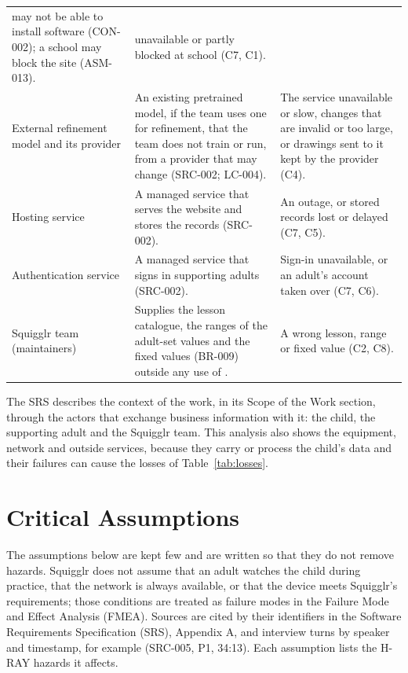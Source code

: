 \documentclass{article}
\begin{document}
{\begin{longtable}{@{}
  >{\raggedright\arraybackslash}p{}
  >{\raggedright\arraybackslash}p{}
  >{\raggedright\arraybackslash}p{}@{}}
may not be able to install software (CON-002); a school may block the site
(ASM-013). & \progname{} unavailable or partly blocked at school (C7, C1). \\
\addlinespace
External refinement model and its provider & An existing pretrained model, if
the team uses one for refinement, that the team does not train or run, from a
provider that may change (SRC-002; LC-004). & The service unavailable or slow,
changes that are invalid or too large, or drawings sent to it kept by the
provider (C4). \\
\addlinespace
Hosting service & A managed service that serves the website and stores the
records (SRC-002). & An outage, or stored records lost or delayed (C7, C5). \\
\addlinespace
Authentication service & A managed service that signs in supporting adults
(SRC-002). & Sign-in unavailable, or an adult's account taken over (C7, C6). \\
\addlinespace
Squigglr team (maintainers) & Supplies the lesson catalogue, the ranges of the
adult-set values and the fixed values (BR-009) outside any use of \progname{}. &
A wrong lesson, range or fixed value (C2, C8). \\
\end{longtable}
}

The SRS describes the context of the work, in its Scope of the Work section,
through the actors that exchange business information with it: the child, the
supporting adult and the Squigglr team. This analysis also shows the equipment,
network and outside services, because they carry or process the child's data and
their failures can cause the losses of Table~\ref{tab:losses}.

\section{Critical Assumptions}\label{sec:assumptions}

The assumptions below are kept few and are written so that they do not remove
hazards. Squigglr does not assume that an adult watches the child during
practice, that the network is always available, or that the device meets
Squigglr's requirements; those conditions are treated as failure modes in the
Failure Mode and Effect Analysis (FMEA). Sources are cited by their identifiers
in the Software Requirements Specification (SRS), Appendix A, and interview
turns by speaker and timestamp, for example (SRC-005, P1, 34:13). Each
assumption lists the H-RAY hazards it affects.
\end{document}
